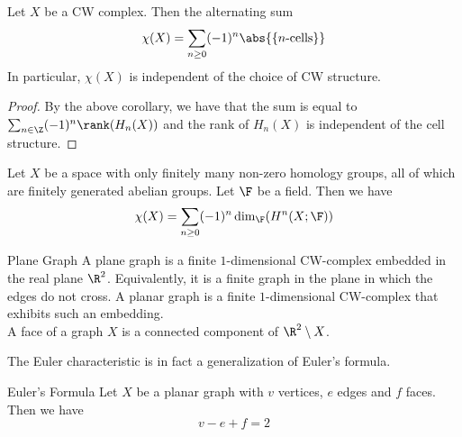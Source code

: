\documentclass[a4paper]{article}
\begin{document}
\begin{crl}{}{} Let $X$ be a CW complex. Then the alternating sum $$\chi(X)=\sum_{n\geq 0}(-1)^n\abs{\{n\text{-cells}\}}$$ In particular, $\chi(X)$ is independent of the choice of CW structure. 
\begin{proof}
By the above corollary, we have that the sum is equal to $\sum_{n\in\Z}(-1)^n\rank(H_n(X))$ and the rank of $H_n(X)$ is independent of the cell structure. 
\end{proof}
\end{crl}

\begin{lmm}{}{} Let $X$ be a space with only finitely many non-zero homology groups, all of which are finitely generated abelian groups. Let $\F$ be a field. Then we have $$\chi(X)=\sum_{n\geq 0}(-1)^n\dim_\F(H^n(X;\F))$$
\end{lmm}

\begin{defn}{Plane Graph}{} A plane graph is a finite $1$-dimensional CW-complex embedded in the real plane $\R^2$. Equivalently, it is a finite graph in the plane in which the edges do not cross. A planar graph is a finite $1$-dimensional CW-complex that exhibits such an embedding. \\

A face of a graph $X$ is a connected component of $\R^2\setminus X$. 
\end{defn}

The Euler characteristic is in fact a generalization of Euler's formula. 

\begin{prp}{Euler's Formula}{} Let $X$ be a planar graph with $v$ vertices, $e$ edges and $f$ faces. Then we have $$v-e+f=2$$
\end{prp}
\end{document}
